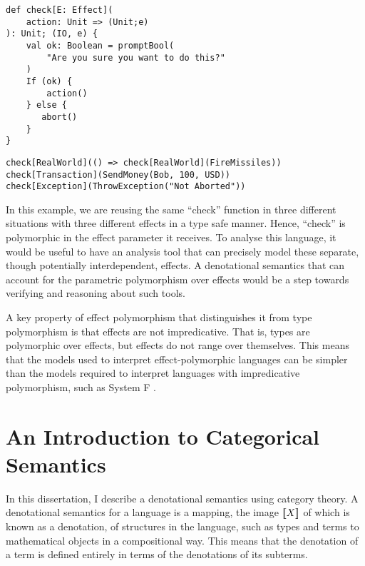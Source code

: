 \documentclass{Report}
\begin{document}
\begin{framed}
    \begin{framed}
        \begin{verbatim}
def check[E: Effect](
    action: Unit => (Unit;e)
): Unit; (IO, e) {
    val ok: Boolean = promptBool(
        "Are you sure you want to do this?"
    )
    If (ok) {
        action()
    } else {
       abort()
    }
}  
            \end{verbatim}
    \end{framed}

    \begin{framed}
        \begin{verbatim}
check[RealWorld](() => check[RealWorld](FireMissiles))
check[Transaction](SendMoney(Bob, 100, USD))
check[Exception](ThrowException("Not Aborted"))
        \end{verbatim}
    \end{framed}
\end{framed}

In this example, we are reusing the same “check” function in three different situations with three different effects in a type safe manner. Hence, “check” is polymorphic in the effect parameter it receives. To analyse this language, it would be useful to have an analysis tool that can precisely model these separate, though potentially interdependent, effects. A denotational semantics that can account for the parametric polymorphism over effects would be a step towards verifying and reasoning about such tools. 

A key property of effect polymorphism that distinguishes it from type polymorphism is that effects are not impredicative. That is, types are polymorphic over effects, but effects do not range over themselves. This means that the models used to interpret effect-polymorphic languages can be simpler than the models required to interpret languages with impredicative polymorphism, such as System F \cite{PolymorphismIsNotSetTheoretic}. 


\section{An Introduction to Categorical Semantics}

In this dissertation, I describe a denotational semantics using category theory. A denotational semantics for a language is a mapping, the image ${\bf [\![}X{\bf ]\!]}$ of which is known as a denotation, of structures in the language, such as types and terms to mathematical objects in a compositional way. This means that the denotation of a term is defined entirely in terms of the denotations of its subterms.
\end{document}

